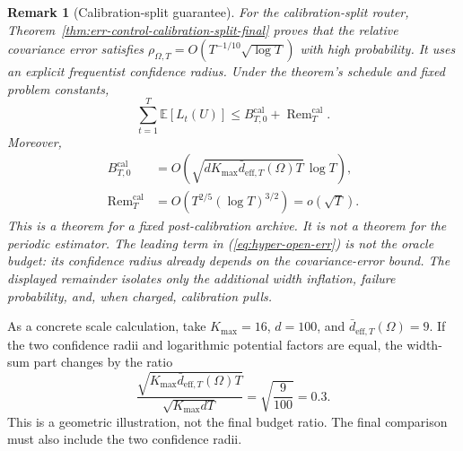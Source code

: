 \documentclass{article} %
\newtheorem{remark}{Remark}
\renewcommand{\eqref}[1]{\textup{(\ref{#1})}}
\begin{document}
\begin{remark}[Calibration-split guarantee]
For the calibration-split router, Theorem~\ref{thm:err-control-calibration-split-final} proves that the relative covariance error satisfies $\rho_{\Omega,T}=O(T^{-1/10}\sqrt{\log T})$ with high probability. It uses an explicit frequentist confidence radius. Under the theorem's schedule and fixed problem constants,
\begin{equation}
\label{eq:hyper-open-err}
\sum_{t=1}^{T}\mathbb{E}[L_t(U)]
\le
B_{T,0}^{\mathrm{cal}}
+
\operatorname{Rem}_T^{\mathrm{cal}}.
\end{equation}
Moreover,
\begin{equation}
\label{eq:hyper-open-rates}
\begin{aligned}
B_{T,0}^{\mathrm{cal}}
&=
O\!\left(
\sqrt{dK_{\max}\bar d_{\mathrm{eff},T}(\Omega)T}\,\log T
\right),\\
\operatorname{Rem}_T^{\mathrm{cal}}
&=
O\!\left(T^{2/5}(\log T)^{3/2}\right)
=o(\sqrt T).
\end{aligned}
\end{equation}
This is a theorem for a fixed post-calibration archive. It is not a theorem for the periodic estimator.
The leading term in \eqref{eq:hyper-open-err} is not the oracle budget: its
confidence radius already depends on the covariance-error bound. The displayed
remainder isolates only the additional width inflation, failure probability,
and, when charged, calibration pulls.
\end{remark}

As a concrete scale calculation, take \(K_{\max}=16\), \(d=100\), and
\(\bar d_{\mathrm{eff},T}(\Omega)=9\).
If the two confidence radii and logarithmic potential factors are equal, the width-sum part changes by the ratio
\begin{equation}
\label{eq:hyper-example-ratio}
\frac{
\sqrt{K_{\max}\bar d_{\mathrm{eff},T}(\Omega)T}
}{
\sqrt{K_{\max}dT}
}
=
\sqrt{\frac{9}{100}}
=
0.3.
\end{equation}
This is a geometric illustration, not the final budget ratio. The final comparison must also include the two confidence radii.
\end{document}
